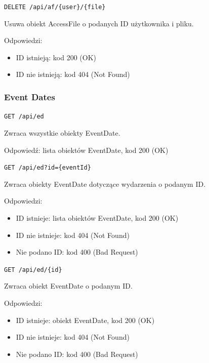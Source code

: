 \documentclass[a4paper,twoside,12pt]{book}
\begin{document}
\label{delete-accessfile}

\texttt{DELETE\ /api/af/\{user\}/\{file\}}

Usuwa obiekt AccessFile o podanych ID użytkownika i pliku.

Odpowiedzi: 
\begin{itemize}
	\item ID istnieją: kod 200 (OK) 
	\item ID nie istnieją: kod 404 (Not Found)
\end{itemize}

\subsubsection{Event Dates}\label{event-dates}

\label{get-all-eventdates}

\texttt{GET\ /api/ed}

Zwraca wszystkie obiekty EventDate.

Odpowiedź: lista obiektów EventDate, kod 200 (OK)

\label{get-eventdates-by-event-id}

\texttt{GET\ /api/ed?id=\{eventId\}}

Zwraca obiekty EventDate dotyczące wydarzenia o podanym ID.

Odpowiedzi: 
\begin{itemize}
	\item ID istnieje: lista obiektów EventDate, kod 200 (OK) 
	\item ID nie istnieje: kod 404 (Not Found) 
	\item Nie podano ID: kod 400 (Bad Request)
\end{itemize}

\label{get-eventdate-by-id}

\texttt{GET\ /api/ed/\{id\}}

Zwraca obiekt EventDate o podanym ID.

Odpowiedzi: 
\begin{itemize}
	\item ID istnieje: obiekt EventDate, kod 200 (OK) 
	\item ID nie istnieje: kod 404 (Not Found) 
	\item Nie podano ID: kod 400 (Bad Request)
\end{itemize}
\end{document}
